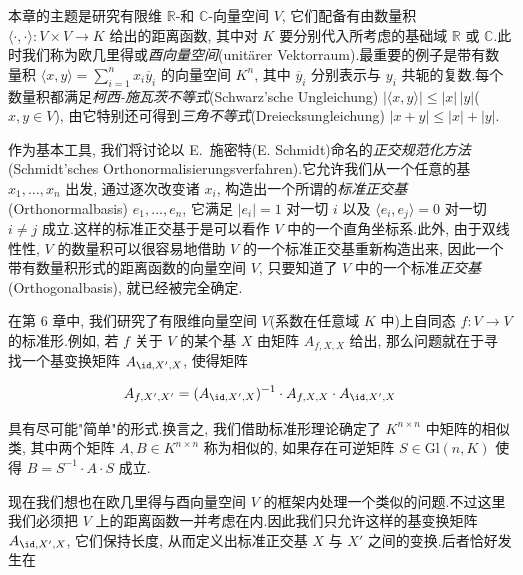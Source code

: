 本章的主题是研究有限维 $\mathbb{R}$-和 $\mathbb{C}$-向量空间 $V$, 它们配备有由数量积 $\langle \cdot, \cdot \rangle \colon V \times V \longrightarrow K$ 给出的距离函数, 其中对 $K$ 要分别代入所考虑的基础域 $\mathbb{R}$ 或 $\mathbb{C}$.此时我们称为欧几里得或\emph{酉向量空间}(\textup{unitärer Vektorraum}).最重要的例子是带有数量积 $\langle x, y \rangle = \sum_{i = 1}^{n} x_i \overline{y}_i$ 的向量空间 $K^n$, 其中 $\overline{y}_i$ 分别表示与 $y_i$ 共轭的复数.每个数量积都满足\emph{柯西-施瓦茨不等式}(\textup{Schwarz'sche Ungleichung}) $|\langle x, y \rangle| \leq |x| \, |y|$($x, y \in V$), 由它特别还可得到\emph{三角不等式}(\textup{Dreiecksungleichung}) $|x + y| \leq |x| + |y|$.

作为基本工具, 我们将讨论以 E.~施密特(E. Schmidt)命名的\emph{正交规范化方法}(\textup{Schmidt'sches Orthonormalisierungsverfahren}).它允许我们从一个任意的基 $x_1, \ldots, x_n$ 出发, 通过逐次改变诸 $x_i$, 构造出一个所谓的\emph{标准正交基}(\textup{Orthonormalbasis}) $e_1, \ldots, e_n$, 它满足 $|e_i| = 1$ 对一切 $i$ 以及 $\langle e_i, e_j \rangle = 0$ 对一切 $i \neq j$ 成立.这样的标准正交基于是可以看作 $V$ 中的一个直角坐标系.此外, 由于双线性性, $V$ 的数量积可以很容易地借助 $V$ 的一个标准正交基重新构造出来, 因此一个带有数量积形式的距离函数的向量空间 $V$, 只要知道了 $V$ 中的一个标准\emph{正交基}(\textup{Orthogonalbasis}), 就已经被完全确定.

在第 6 章中, 我们研究了有限维向量空间 $V$(系数在任意域 $K$ 中)上自同态 $f \colon V \longrightarrow V$ 的标准形.例如, 若 $f$ 关于 $V$ 的某个基 $X$ 由矩阵 $A_{f, X, X}$ 给出, 那么问题就在于寻找一个基变换矩阵 $A_{\id, X', X}$, 使得矩阵

\[
A_{f, X', X'} = (A_{\id, X', X})^{-1} \cdot A_{f, X, X} \cdot A_{\id, X', X}
\]

具有尽可能"简单"的形式.换言之, 我们借助标准形理论确定了 $K^{n \times n}$ 中矩阵的相似类, 其中两个矩阵 $A, B \in K^{n \times n}$ 称为相似的, 如果存在可逆矩阵 $S \in \mathrm{Gl}(n, K)$ 使得 $B = S^{-1} \cdot A \cdot S$ 成立.

现在我们想也在欧几里得与酉向量空间 $V$ 的框架内处理一个类似的问题.不过这里我们必须把 $V$ 上的距离函数一并考虑在内.因此我们只允许这样的基变换矩阵 $A_{\id, X', X}$, 它们保持长度, 从而定义出标准正交基 $X$ 与 $X'$ 之间的变换.后者恰好发生在


